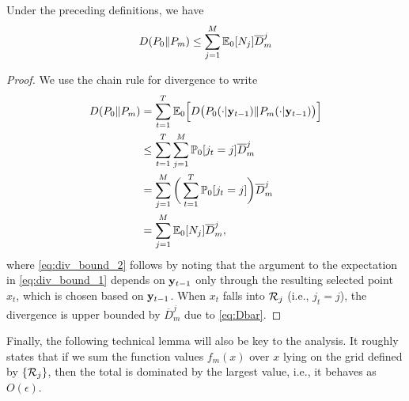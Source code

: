\documentclass[english,onecolumn,final,11pt]{IEEEtran} %
\newcommand{\Dbar}{\overline{D}}
\begin{document}
\begin{lemma}
    Under the preceding definitions, we have
    \begin{equation}
        D(P_0 \| P_m) \le \sum_{j=1}^M \EE_0[N_j]\Dbar_m^j \label{eq:div_bound}
    \end{equation}
\end{lemma}
\begin{proof}
    We use the chain rule for divergence \cite[Sec.~2.5]{Cov01} to write 
    {\allowdisplaybreaks \begin{align}
    	D(P_0 \| P_m) 
    		&= \sum_{t=1}^T \EE_{0} \Big[ D\big( P_0(\cdot|\yv_{t-1}) \| P_m(\cdot|\yv_{t-1}) \big) \Big]  \label{eq:div_bound_1} \\
    		&\le \sum_{t=1}^T \sum_{j=1}^M \PP_0[ j_t = j ] \Dbar_m^j \label{eq:div_bound_2} \\
    		&= \sum_{j=1}^M \bigg(\sum_{t=1}^T \PP_0[ j_t = j ] \bigg) \Dbar_m^j \\
    		&= \sum_{j=1}^M \EE_0[N_j]\Dbar_m^j, \label{eq:div_bound_3}
    \end{align} }
    where \eqref{eq:div_bound_2} follows by noting that the argument to the expectation in \eqref{eq:div_bound_1} depends on $\mathbf{y}_{t-1}$ only through the resulting selected point $x_t$, which is chosen based on $\mathbf{y}_{t-1}$.  When $x_t$ falls into $\mathcal{R}_j$ (i.e., $j_t = j$), the divergence is upper bounded by $\Dbar_m^j$ due to \eqref{eq:Dbar}.
\end{proof}

Finally, the following technical lemma will also be key to the analysis.  It roughly states that if we sum the function values $f_m(x)$ over $x$ lying on the grid defined by $\{\mathcal{R}_j\}$, then the total is dominated by the largest value, i.e., it behaves as $O(\epsilon)$.
\end{document}
